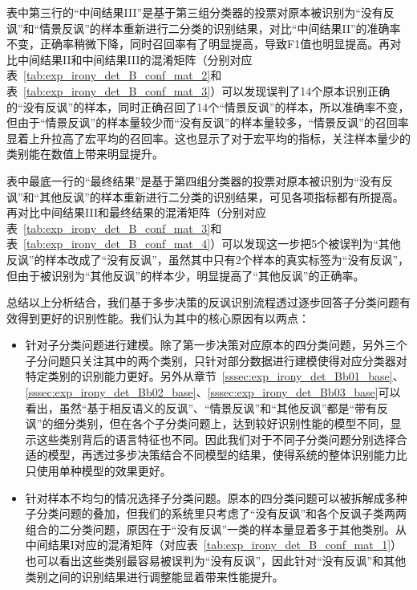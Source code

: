 表中第三行的“中间结果III”是基于第三组分类器的投票对原本被识别为“没有反讽”和“情景反讽”的样本重新进行二分类的识别结果，对比“中间结果II”的准确率不变，正确率稍微下降，同时召回率有了明显提高，导致F1值也明显提高。再对比中间结果II和中间结果III的混淆矩阵（分别对应表~\ref{tab:exp_irony_det_B_conf_mat_2}和表~\ref{tab:exp_irony_det_B_conf_mat_3}）可以发现误判了14个原本识别正确的“没有反讽”的样本，同时正确召回了14个“情景反讽”的样本，所以准确率不变，但由于“情景反讽”的样本量较少而“没有反讽”的样本量较多，“情景反讽”的召回率显着上升拉高了宏平均的召回率。这也显示了对于宏平均的指标，关注样本量少的类别能在数值上带来明显提升。

表中最底一行的“最终结果”是基于第四组分类器的投票对原本被识别为“没有反讽”和“其他反讽”的样本重新进行二分类的识别结果，可见各项指标都有所提高。再对比中间结果III和最终结果的混淆矩阵（分别对应表~\ref{tab:exp_irony_det_B_conf_mat_3}和表~\ref{tab:exp_irony_det_B_conf_mat_4}）可以发现这一步把5个被误判为“其他反讽”的样本改成了“没有反讽”，虽然其中只有2个样本的真实标签为“没有反讽”，但由于被识别为“其他反讽”的样本少，明显提高了“其他反讽”的正确率。

总结以上分析结合，我们基于多步决策的反讽识别流程透过逐步回答子分类问题有效得到更好的识别性能。我们认为其中的核心原因有以两点：

\begin{itemize}

\item 针对子分类问题进行建模。除了第一步决策对应原本的四分类问题，另外三个子分问题只关注其中的两个类别，只针对部分数据进行建模使得对应分类器对特定类别的识别能力更好。另外从章节~\ref{sssec:exp_irony_det_Bb01_base}、\ref{sssec:exp_irony_det_Bb02_base}、\ref{sssec:exp_irony_det_Bb03_base}可以看出，虽然“基于相反语义的反讽”、“情景反讽”和“其他反讽”都是“带有反讽”的细分类别，但在各个子分类问题上，达到较好识别性能的模型不同，显示这些类别背后的语言特征也不同。因此我们对于不同子分类问题分别选择合适的模型，再透过多步决策结合不同模型的结果，使得系统的整体识别能力比只使用单种模型的效果更好。

\item 针对样本不均匀的情况选择子分类问题。原本的四分类问题可以被拆解成多种子分类问题的叠加，但我们的系统里只考虑了“没有反讽”和各个反讽子类两两组合的二分类问题，原因在于“没有反讽”一类的样本量显着多于其他类别。从中间结果I对应的混淆矩阵（对应表~\ref{tab:exp_irony_det_B_conf_mat_1}）也可以看出这些类别最容易被误判为“没有反讽”，因此针对“没有反讽”和其他类别之间的识别结果进行调整能显着带来性能提升。

\end{itemize}

